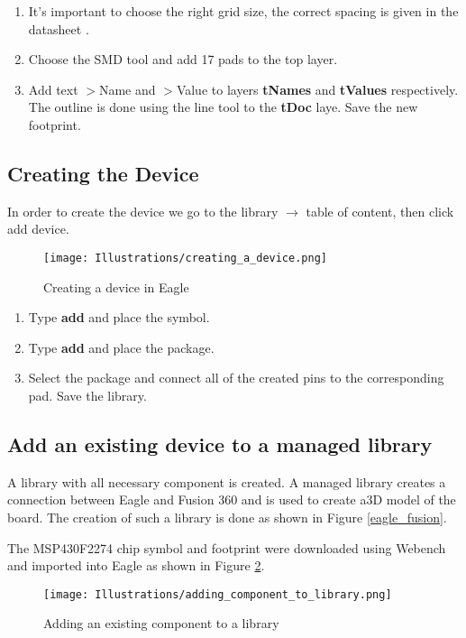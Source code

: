 \begin{enumerate}
\item It's important to choose the right grid size, the correct spacing is given in the datasheet \cite{TexasInstruments2012}. 
\item Choose the SMD tool and add 17 pads to the top layer.
\item Add text $>$Name and $>$Value to layers \textbf{tNames} and \textbf{tValues} respectively. The outline is done using the line tool to the \textbf{tDoc} laye. Save the new footprint.
\end{enumerate}


\subsection{Creating the Device}
In order to create the device we go to the library $\rightarrow$ table of content, then click add device.
\begin{figure}[h]
\begin{center}
\center
\texttt{[image: Illustrations/creating\_a\_device.png]}  
\caption{Creating a device in Eagle}
\label{eagle_package}
\end{center}
\end{figure}

\begin{enumerate}
\item Type \textbf{add} and place the symbol.
\item Type \textbf{add} and place the package.
\item Select the package and connect all of the created pins to the corresponding pad. Save the library.
\end{enumerate}


\subsection{ Add an existing device to a managed library }
A library with all necessary component is created. A managed library creates a connection between Eagle and Fusion 360 and is used to create a3D model of the board. The creation of such a library is done as shown in Figure \ref{eagle_fusion}.

The MSP430F2274 chip symbol and footprint were downloaded using Webench \cite{TexasInstruments} and imported into Eagle as shown in Figure \ref{adding_to_library}. 

\begin{figure}[h]
\begin{center}
\center
\texttt{[image: Illustrations/adding\_component\_to\_library.png]}  
\caption{Adding an existing component to a library}
\label{adding_to_library}
\end{center}
\end{figure}

